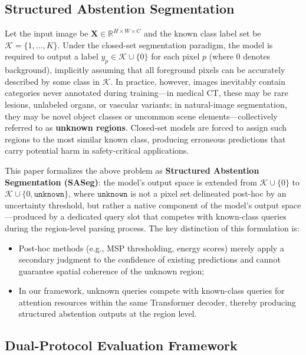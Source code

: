 \documentclass[journal]{IEEEtai}
\newcommand{\R}{\mathbb{R}}
\newcommand{\cK}{\mathcal{K}}
\begin{document}
\subsection{Structured Abstention Segmentation}\label{sec:problem:sa}

Let the input image be $\mathbf{X} \in \R^{H \times W \times C}$ and the known class
label set be $\cK = \{1, \ldots, K\}$.
Under the closed-set segmentation paradigm, the model is required to output a label
$y_p \in \cK \cup \{0\}$ for each pixel $p$ (where $0$ denotes background), implicitly
assuming that all foreground pixels can be accurately described by some class in $\cK$.
In practice, however, images inevitably contain categories never annotated during
training---in medical CT, these may be rare lesions, unlabeled organs, or vascular
variants; in natural-image segmentation, they may be novel object classes or uncommon
scene elements---collectively referred to as \textbf{unknown regions}.
Closed-set models are forced to assign such regions to the most similar known class,
producing erroneous predictions that carry potential harm in safety-critical applications.

This paper formalizes the above problem as \textbf{Structured Abstention Segmentation (SASeg)}:
the model's output space is extended from $\cK \cup \{0\}$ to
$\cK \cup \{0, \texttt{unknown}\}$,
where $\texttt{unknown}$ is not a pixel set delineated post-hoc by an uncertainty
threshold, but rather a native component of the model's output space---produced by
a dedicated query slot that competes with known-class queries during the region-level
parsing process.
The key distinction of this formulation is:
\begin{itemize}[nosep]
  \item Post-hoc methods (e.g., MSP thresholding, energy scores) merely apply a
        secondary judgment to the confidence of existing predictions and cannot guarantee
        spatial coherence of the unknown region;
  \item In our framework, unknown queries compete with known-class queries for attention
        resources within the same Transformer decoder, thereby producing structured
        abstention outputs at the region level.
\end{itemize}

\subsection{Dual-Protocol Evaluation Framework}\label{sec:problem:protocol}
\end{document}
